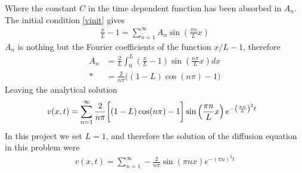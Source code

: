 \documentclass[norsk, a4paper]{article}
\newcommand\lr[1]{\left(#1\right)}
\begin{document}
Where the constant $C$ in the time dependent function has been absorbed in $A_n$. The initial condition \eqref{vinit} gives
\begin{align*}
\frac{x}{L}-1 = \sum_{n=1}^\infty A_n\sin\lr{\frac{\pi n}{L}x}
\end{align*}
$A_n$ is nothing but the Fourier coefficients of the function $x/L - 1$, therefore
\begin{align*}
A_n &= \frac{2}{L}\int_0^L \lr{\frac{x}{L}-1}\sin\lr{\frac{n \pi }{L}x} dx \\*
&= \frac{2}{n\pi}\bigg((1-L)\cos(n\pi)-1\bigg)
\end{align*}
Leaving the analytical solution
\begin{align*}
\hspace{-2.5mm} v(x,t) = \sum_{n=1}^\infty \frac{2}{n\pi}\bigg[(1-L)\cos(n\pi)-1\bigg]\sin\lr{\frac{\pi n}{L}x}e^{-{\lr{\frac{\pi n}{L}}^2t}}
\end{align*}
In this project we set $L=1$, and therefore the solution of the diffusion equation in this problem were
\begin{align}
 v(x,t) = \sum_{n=1}^\infty -\frac{2}{n\pi}\sin\lr{\pi n x}e^{-{\lr{\pi n}^2t}} \label{solutionv}
\end{align}
\end{document}
